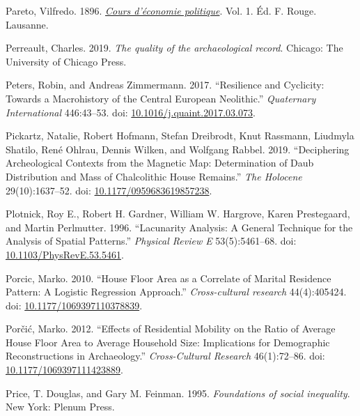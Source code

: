 \documentclass[
  12pt,
]{book}
\newlength{\cslhangindent}
\newlength{\cslentryspacingunit} %
\newenvironment{CSLReferences}[2] %
 {%
  \setlength{\parindent}{0pt}
  \ifodd #1
  \let\oldpar\par
  \def\par{\hangindent=\cslhangindent\oldpar}
  \fi
  \setlength{\parskip}{#2\cslentryspacingunit}
 }%
 {}
\begin{document}
\begin{CSLReferences}{1}{0}
\leavevmode{}%
Pareto, Vilfredo. 1896. \emph{\href{http://archive.org/details/fp-0148-1}{Cours d'économie politique}}. Vol. 1. Éd. F. Rouge. Lausanne.

\leavevmode{}%
Perreault, Charles. 2019. \emph{The quality of the archaeological record}. Chicago: The University of Chicago Press.

\leavevmode{}%
Peters, Robin, and Andreas Zimmermann. 2017. {``Resilience and Cyclicity: Towards a Macrohistory of the Central European Neolithic.''} \emph{Quaternary International} 446:43--53. doi: \href{https://doi.org/10.1016/j.quaint.2017.03.073}{10.1016/j.quaint.2017.03.073}.

\leavevmode{}%
Pickartz, Natalie, Robert Hofmann, Stefan Dreibrodt, Knut Rassmann, Liudmyla Shatilo, René Ohlrau, Dennis Wilken, and Wolfgang Rabbel. 2019. {``Deciphering Archeological Contexts from the Magnetic Map: Determination of Daub Distribution and Mass of Chalcolithic House Remains.''} \emph{The Holocene} 29(10):1637--52. doi: \href{https://doi.org/10.1177/0959683619857238}{10.1177/0959683619857238}.

\leavevmode{}%
Plotnick, Roy E., Robert H. Gardner, William W. Hargrove, Karen Prestegaard, and Martin Perlmutter. 1996. {``Lacunarity Analysis: A General Technique for the Analysis of Spatial Patterns.''} \emph{Physical Review E} 53(5):5461--68. doi: \href{https://doi.org/10.1103/PhysRevE.53.5461}{10.1103/PhysRevE.53.5461}.

\leavevmode{}%
Porcic, Marko. 2010. {``House Floor Area as a Correlate of Marital Residence Pattern: A Logistic Regression Approach.''} \emph{Cross-cultural research} 44(4):405424. doi: \href{https://doi.org/10.1177/1069397110378839}{10.1177/1069397110378839}.

\leavevmode{}%
Porčić, Marko. 2012. {``Effects of Residential Mobility on the Ratio of Average House Floor Area to Average Household Size: Implications for Demographic Reconstructions in Archaeology.''} \emph{Cross-Cultural Research} 46(1):72--86. doi: \href{https://doi.org/10.1177/1069397111423889}{10.1177/1069397111423889}.

\leavevmode{}%
Price, T. Douglas, and Gary M. Feinman. 1995. \emph{Foundations of social inequality}. New York: Plenum Press.


\end{CSLReferences}
\end{document}
